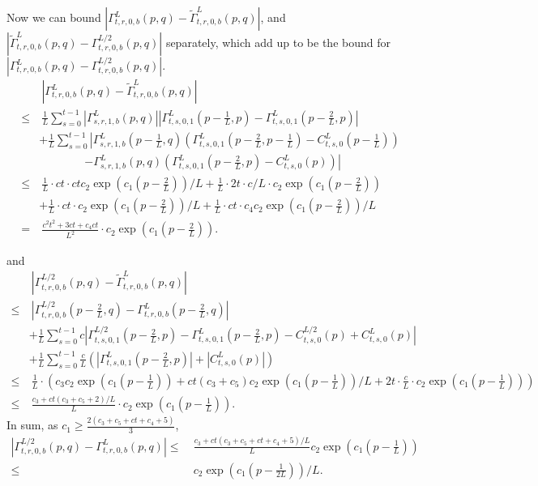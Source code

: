 \documentclass{article}
\theoremstyle{plain}
\theoremstyle{definition}
\begin{document}
Now we can bound $|\Gamma^L_{t,r,0,b}\left(p, q\right)-\tilde\Gamma^L_{t,r,0,b}\left(p, q\right)|$, and $|\tilde\Gamma^L_{t,r,0,b}\left(p, q\right)-\Gamma^{L/2}_{t,r,0,b}\left(p, q\right)|$ separately, which add up to be the bound for $|\Gamma^L_{t,r,0,b}\left(p, q\right)-\Gamma^{L/2}_{t,r,0,b}\left(p, q\right)|$.
\begin{align*} 
    &~ |\Gamma^L_{t,r,0,b}\left(p, q\right)-\tilde\Gamma^L_{t,r,0,b}\left(p, q\right)| \\
    \leq  &~\frac1L \sum_{s=0}^{t-1} |\Gamma^L_{s,r,1,b}\left(p, q\right)|\left|\Gamma^L_{t,s,0,1}\left(p-\frac1L, p\right)-\Gamma^L_{t,s,0,1}\left(p-\frac2L, p\right)\right|  \\
    & + \frac1L \sum_{s=0}^{t-1} \left|\Gamma^L_{s,r,1,b}\left(p-\frac1L, q\right)\left(\Gamma^L_{t,s,0,1}\left(p-\frac2L, p-\frac1L\right)-C^L_{t,s,0}\left(p-\frac1L\right)\right)\right.\\
    & \qquad\qquad \left.- \Gamma^L_{s,r,1,b}\left(p, q\right)\left(\Gamma^L_{t,s,0,1}\left(p-\frac2L, p\right)-C^L_{t,s,0}\left(p\right)\right)\right|\\
    \leq &~ \frac 1L \cdot  ct\cdot ctc_2\exp(c_1(p-\frac2L)) / L + \frac1L \cdot 2t\cdot c / L \cdot c_2\exp(c_1(p-\frac2L)) \\
    & + \frac1L \cdot ct \cdot c_2\exp(c_1(p-\frac2L)) / L + \frac1L \cdot ct \cdot c_4 c_2\exp(c_1(p-\frac2L))/L\\
    = &~ \frac{c^2t^2+3ct+c_4ct}{L^2}
    \cdot c_2\exp(c_1(p-\frac2L)).
\end{align*}

and
\begin{align*} 
     &~ |\Gamma_{t,r,0,b}^{L/2}\left(p, q\right) - \tilde\Gamma_{t,r,0,b}^{L}\left(p, q\right)| \\
     \leq  &~|\Gamma_{t,r,0,b}^{L/2}\left(p-\frac2L, q\right) - \Gamma_{t,r,0,b}^L\left(p-\frac2L, q\right)|  \\
     & + \frac1L \sum_{s=0}^{t-1} c\left|\Gamma_{t,s,0,1}^{L/2}\left(p-\frac2L, p\right) - \Gamma_{t,s,0,1}^L\left(p-\frac2L, p\right)-C_{t,s,0}^{L/2}\left(p\right)+C_{t,s,0}^L\left(p\right)\right|\\
     & + \frac1L \sum_{s=0}^{t-1} \frac cL\left(|\Gamma^L_{t,s,0,1}\left(p-\frac2L, p\right)|+|C^L_{t,s,0}\left(p\right)|\right) \\
     \leq &~ \frac 1L \cdot (c_3c_2 \exp(c_1(p-\frac1L)) +   ct (c_3+c_5) c_2 \exp(c_1(p-\frac1L)) / L + 2t \cdot \frac cL \cdot  c_2 \exp(c_1(p-\frac1L)) )\\
     \leq &~ \frac {c_3+ct(c_3+c_5+2)/L}L \cdot c_2 \exp(c_1(p-\frac1L)).
\end{align*}
In sum, as $c_1\geq \frac{2(c_3+c_5+ct+c_4+5)}3$,
\begin{align*}
    |\Gamma_{t,r,0,b}^{L/2}\left(p, q\right) - \Gamma_{t,r,0,b}^{L}\left(p, q\right)|\leq &~ \frac{c_3+ct(c_3+c_5+ct+c_4+5)/L}{L} c_2 \exp(c_1(p-\frac1L))\\
    \leq &~ c_2 \exp(c_1(p-\frac1{2L})) /L.
\end{align*} 
\end{document}
